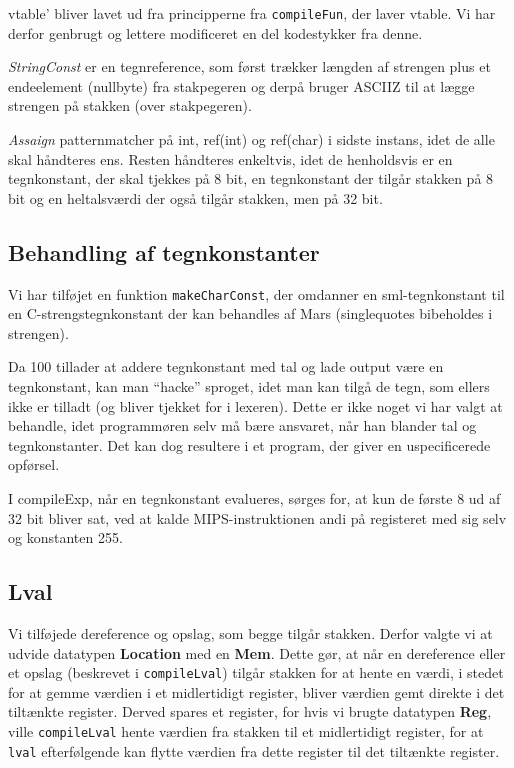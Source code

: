 \documentclass[a4paper, 10pt]{article}
\begin{document}
vtable' bliver lavet ud fra principperne fra \texttt{compileFun}, der laver vtable. Vi har derfor genbrugt og lettere modificeret en del kodestykker fra denne.

\textit{StringConst} er en tegnreference, som først trækker længden af strengen
plus et endeelement (nullbyte) fra stakpegeren og derpå bruger ASCIIZ til at
lægge strengen på stakken (over stakpegeren).

\textit{Assaign} patternmatcher på int, ref(int) og ref(char) i sidste instans,
idet de alle skal håndteres ens. Resten håndteres enkeltvis, idet de
henholdsvis er en tegnkonstant, der skal tjekkes på 8 bit, en tegnkonstant
der tilgår stakken på 8 bit og en heltalsværdi der også tilgår
stakken, men på 32 bit.

\subsection{Behandling af tegnkonstanter}
Vi har tilføjet en funktion \texttt{makeCharConst}, der omdanner en
sml-tegnkonstant til en C-strengstegnkonstant der kan behandles af Mars
(singlequotes bibeholdes i strengen).

Da 100 tillader at addere tegnkonstant med tal og lade output være en
tegnkonstant, kan man ``hacke'' sproget, idet man kan tilgå de tegn, som ellers
ikke er tilladt (og bliver tjekket for i lexeren). Dette er ikke noget vi har
valgt at behandle, idet programmøren selv må bære ansvaret, når han blander tal
og tegnkonstanter. Det kan dog resultere i et program, der giver en
uspecificerede opførsel.

I compileExp, når en tegnkonstant evalueres, sørges for, at kun de første 8 ud
af 32 bit bliver sat, ved at kalde MIPS-instruktionen andi på registeret med
sig selv og konstanten 255. 

\subsection{Lval}
Vi tilføjede dereference og opslag, som begge tilgår stakken. Derfor valgte vi
at udvide datatypen \textbf{Location} med en \textbf{Mem}. Dette gør, at når en
dereference eller et opslag (beskrevet i \texttt{compileLval}) tilgår stakken 
for at hente en værdi, i stedet for at gemme værdien i et midlertidigt
register, bliver værdien gemt direkte i det tiltænkte register. Derved spares et
register, for hvis vi brugte datatypen \textbf{Reg}, ville \texttt{compileLval}
hente værdien fra stakken til et midlertidigt register, for at \texttt{lval}
efterfølgende kan flytte værdien fra dette register til det tiltænkte register.
\end{document}
